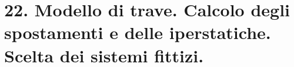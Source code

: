 \section{22. Modello di trave. Calcolo degli spostamenti e delle iperstatiche. Scelta dei sistemi fittizi.}


